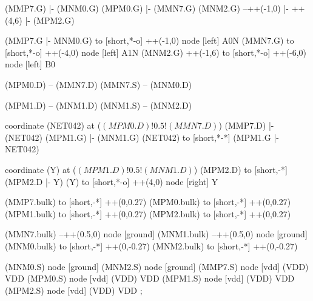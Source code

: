 \begin{circuitikz}[american]
	(MMP7.G) |- (MNM0.G)
	(MPM0.G) |- (MMN7.G)
	(MNM2.G) --++(-1,0) |- ++(4,6) |- (MPM2.G) 
	
	(MMP7.G |- MNM0.G) to [short,*-o] ++(-1,0) node [left] {A0N} 
	(MMN7.G) to [short,*-o] ++(-4,0) node [left] {A1N}
	(MNM2.G) ++(-1,6) to [short,*-o] ++(-6,0) node [left] {B0}
	
	(MPM0.D) -- (MMN7.D)
	(MMN7.S) -- (MNM0.D)
	
	(MPM1.D) -- (MNM1.D)
	(MNM1.S) -- (MNM2.D)
	
	coordinate (NET042) at ($(MPM0.D)!0.5!(MMN7.D)$)
	(MMP7.D) |- (NET042) 
	(MPM1.G) |- (MNM1.G)
	(NET042) to [short,*-*] (MPM1.G |- NET042)
	
	coordinate (Y) at ($(MPM1.D)!0.5!(MNM1.D)$)
	(MPM2.D) to [short,-*] (MPM2.D |- Y)
	(Y) to [short,*-o] ++(4,0) node [right] {Y}
	
	(MMP7.bulk) to [short,-*] ++(0,0.27)
	(MPM0.bulk) to [short,-*] ++(0,0.27)
	(MPM1.bulk) to [short,-*] ++(0,0.27)
	(MPM2.bulk) to [short,-*] ++(0,0.27)
	
	(MMN7.bulk) --++(0.5,0) node [ground]{}
	(MNM1.bulk) --++(0.5,0) node [ground]{}
	(MNM0.bulk) to [short,-*] ++(0,-0.27)	
	(MNM2.bulk) to [short,-*] ++(0,-0.27)
	


	(MNM0.S) node [ground] {}
	(MNM2.S) node [ground] {}
	(MMP7.S) node [vdd] (VDD) {VDD}
	(MPM0.S) node [vdd] (VDD) {VDD}
	(MPM1.S) node [vdd] (VDD) {VDD}
	(MPM2.S) node [vdd] (VDD) {VDD}
;

\end{circuitikz}
